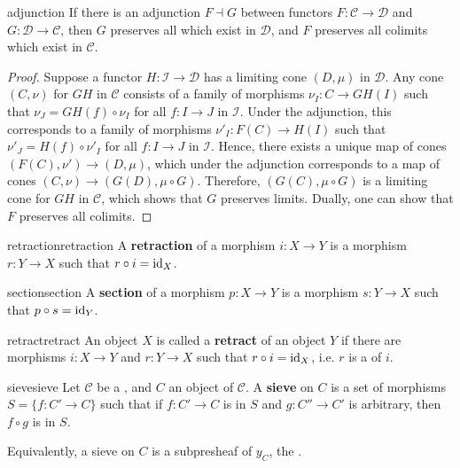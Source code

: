 \begin{example}{adjunction}
    If there is an adjunction $F \dashv G$ between functors $F : \mathcal{C} \to \mathcal{D}$ and $G : \mathcal{D} \to \mathcal{C}$, then $G$ preserves all  which exist in $\mathcal{D}$, and $F$ preserves all colimits which exist in $\mathcal{C}$.
    \begin{proof}
        Suppose a functor $H : \mathcal{I} \to \mathcal{D}$ has a limiting cone $(D, \mu)$ in $\mathcal{D}$. Any cone $(C, \nu)$ for $GH$ in $\mathcal{C}$ consists of a family of morphisms $\nu_I : C \to GH(I)$ such that $\nu_J = GH(f) \circ \nu_I$ for all $f : I \to J$ in $\mathcal{I}$. Under the adjunction, this corresponds to a family of morphisms $\nu'_I : F(C) \to H(I)$ such that $\nu'_J = H(f) \circ \nu'_I$ for all $f : I \to J$ in $\mathcal{I}$. Hence, there exists a unique map of cones $(F(C), \nu') \to (D, \mu)$, which under the adjunction corresponds to a map of cones $(C, \nu) \to (G(D), \mu \circ G)$. Therefore, $(G(C), \mu \circ G)$ is a limiting cone for $GH$ in $\mathcal{C}$, which shows that $G$ preserves limits. Dually, one can show that $F$ preserves all colimits.
    \end{proof}
\end{example}

\begin{topic}{retraction}{retraction}
    A \textbf{retraction} of a morphism $i : X \to Y$ is a morphism $r : Y \to X$ such that $r \circ i = \text{id}_X$.
\end{topic}

\begin{topic}{section}{section}
    A \textbf{section} of a morphism $p : X \to Y$ is a morphism $s : Y \to X$ such that $p \circ s = \text{id}_Y$.
\end{topic}

\begin{topic}{retract}{retract}
    An object $X$ is called a \textbf{retract} of an object $Y$ if there are morphisms $i : X \to Y$ and $r : Y \to X$ such that $r \circ i = \text{id}_X$, i.e. $r$ is a  of $i$.
\end{topic}

\begin{topic}{sieve}{sieve}
    Let $\mathcal{C}$ be a , and $C$ an object of $\mathcal{C}$. A \textbf{sieve} on $C$ is a set of morphisms $S = \{ f : C' \to C \}$ such that if $f : C' \to C$ is in $S$ and $g : C'' \to C'$ is arbitrary, then $f \circ g$ is in $S$.
    
    Equivalently, a sieve on $C$ is a subpresheaf of $y_C$, the .
\end{topic}

